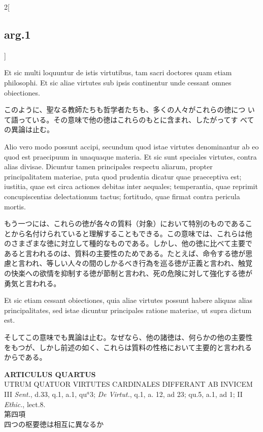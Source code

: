 \documentclass[paper=a4paper,fontsize=10pt,jafontsize=9pt,titlepage]{jlreq}
\begin{document}
\begin{paracol}{2}[\subsection{arg.1}]
\switchcolumn*

Et sic multi loquuntur de istis virtutibus, tam sacri doctores quam
 etiam philosophi. Et sic aliae virtutes sub ipsis continentur unde
 cessant omnes obiectiones.

\switchcolumn

このように、聖なる教師たちも哲学者たちも、多くの人々がこれらの徳につ
 いて語っている。その意味で他の徳はこれらのもとに含まれ、したがってす
 べての異論は止む。

\switchcolumn*

Alio vero modo possunt accipi, secundum quod istae virtutes
 denominantur ab eo quod est praecipuum in unaquaque materia. Et sic
 sunt speciales virtutes, contra alias divisae. Dicuntur tamen
 principales respectu aliarum, propter principalitatem materiae, puta
 quod prudentia dicatur quae praeceptiva est; iustitia, quae est circa
 actiones debitas inter aequales; temperantia, quae reprimit
 concupiscentias delectationum tactus; fortitudo, quae firmat contra
 pericula mortis.

\switchcolumn

もう一つには、これらの徳が各々の質料（対象）において特別のものであるこ
とから名付けられていると理解することもできる。この意味では、これらは他
のさまざまな徳に対立して種的なものである。しかし、他の徳に比べて主要で
あると言われるのは、質料の主要性のためである。たとえば、命令する徳が思
慮と言われ、等しい人々の間のしかるべき行為を巡る徳が正義と言われ、触覚
の快楽への欲情を抑制する徳が節制と言われ、死の危険に対して強化する徳が
勇気と言われる。

\switchcolumn*

Et sic etiam cessant obiectiones, quia aliae virtutes possunt habere
 aliquas alias principalitates, sed istae dicuntur principales ratione
 materiae, ut supra dictum est.

\switchcolumn

そしてこの意味でも異論は止む。なぜなら、他の諸徳は、何らかの他の主要性
をもつが、しかし前述の如く、これらは質料の性格において主要的と言われる
からである。

\end{paracol}
\newpage
{}
{}
\setcounter{section}{4}
\setcounter{subsection}{0}

\begin{center}
{\Large {\bfseries ARTICULUS QUARTUS}}\\
{\large UTRUM QUATUOR VIRTUTES CARDINALES DIFFERANT AB INVICEM}\\
{\footnotesize III {\itshape Sent.}, d.33, q.1, a.1, qu$^{a}$3; {\itshape De Virtut.}, q.1, a. 12, ad 23; qu.5, a.1, ad 1; II {\itshape Ethic.}, lect.8.}\\
{\Large 第四項\\四つの枢要徳は相互に異なるか}
\end{center}
\end{document}
